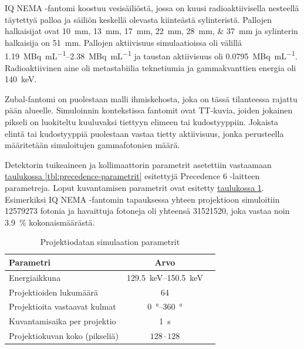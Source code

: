 IQ NEMA -fantomi koostuu vesisäiliöstä, jossa on kuusi radioaktiivisella nesteellä täytettyä palloa ja säiliön keskellä olevasta kiinteästä sylinteristä\cite{nema2018, mancosu_4d-pet_2009}. Pallojen halkaisijat ovat \qtylist{10;13;17;22;28;37}{\milli\meter} ja sylinterin halkaisija on \qty{51}{\milli\meter}\cite{nema2018, mancosu_4d-pet_2009}. Pallojen aktiivisuus simulaatioissa oli välillä \qtyrange{1.19}{2.38}{\mega\becquerel\per\milli\liter} ja taustan aktiivisuus oli \qty{0.0795}{\mega\becquerel\per\milli\liter}. Radioaktiivinen aine oli metastabiilia teknetiumia ja gammakvanttien energia oli \qty{140}{\kilo\electronvolt}.

Zubal-fantomi on puolestaan malli ihmiskehosta, joka on tässä tilanteessa rajattu pään alueelle. Simuloinnin kontekstissa fantomit ovat TT-kuvia, joiden jokainen pikseli on luokiteltu kuuluvaksi tiettyyn elimeen tai kudostyyppiin.\cite{zubal_computerized_1994} Jokaista elintä tai kudostyyppiä puolestaan vastaa tietty aktiivisuus, jonka perusteella määritetään simuloitujen gammafotonien määrä.

Detektorin tuikeaineen ja kollimaattorin parametrit asetettiin vastaamaan \hyperref[tbl:precedence-parametrit]{taulukossa \ref*{tbl:precedence-parametrit}} esitettyjä Precedence 6 -laitteen parametreja\cite{peters_towards_2019}. Loput kuvantamisen parametrit ovat esitetty \hyperref[tbl:simulaation_parametrit]{taulukossa \ref*{tbl:simulaation_parametrit}}. Esimerkiksi IQ NEMA -fantomin tapauksessa yhteen projektioon simuloitiin 12579273 fotonia ja havaittuja fotoneja oli yhteensä 31521520, joka vastaa noin \qty{3.9}{\percent} kokonaismäärästä.
\begin{table}[H]
    \centering
    \captionsetup{width=.9\linewidth}
    \caption{Projektiodatan simulaation parametrit}
        \begin{tabular}{lcc}
            \toprule
            Parametri & Arvo & \\
            \midrule
            Energiaikkuna & \qtyrange{129.5}{150.5}{\kilo\electronvolt}\\
            Projektioiden lukumäärä & 64\\
            Projektioita vastaavat kulmat & \qtyrange{0}{360}{\degree}\\
            Kuvantamisaika per projektio & \qty{1}{\second}\\
            Projektiokuvan koko (pikseliä) & $128\cdot 128$\\
            \bottomrule
        \end{tabular}
    \label{tbl:simulaation_parametrit}
\end{table}